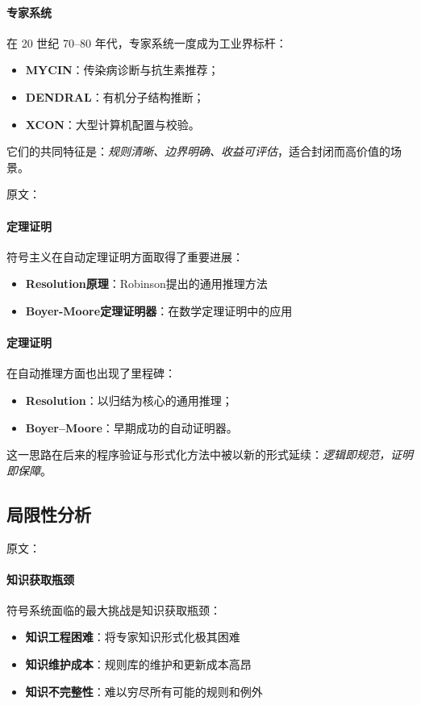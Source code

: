 \paragraph{专家系统}
在 20 世纪 70–80 年代，专家系统一度成为工业界标杆：
\begin{itemize}
\item \textbf{MYCIN}：传染病诊断与抗生素推荐；
\item \textbf{DENDRAL}：有机分子结构推断；
\item \textbf{XCON}：大型计算机配置与校验。
\end{itemize}
它们的共同特征是：\emph{规则清晰、边界明确、收益可评估}，适合封闭而高价值的场景。

原文：
\paragraph{定理证明}
符号主义在自动定理证明方面取得了重要进展：
\begin{itemize}
\item \textbf{Resolution原理}：Robinson提出的通用推理方法
\item \textbf{Boyer-Moore定理证明器}：在数学定理证明中的应用
\end{itemize}
\paragraph{定理证明}
在自动推理方面也出现了里程碑：
\begin{itemize}
\item \textbf{Resolution}：以归结为核心的通用推理；
\item \textbf{Boyer–Moore}：早期成功的自动证明器。
\end{itemize}
这一思路在后来的程序验证与形式化方法中被以新的形式延续：\emph{逻辑即规范，证明即保障}。


\subsection{局限性分析}

原文：
\paragraph{知识获取瓶颈}
符号系统面临的最大挑战是知识获取瓶颈：
\begin{itemize}
\item \textbf{知识工程困难}：将专家知识形式化极其困难
\item \textbf{知识维护成本}：规则库的维护和更新成本高昂
\item \textbf{知识不完整性}：难以穷尽所有可能的规则和例外
\end{itemize}
